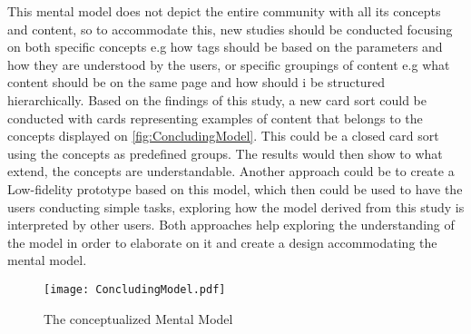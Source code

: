 This mental model does not depict the entire community with all its concepts and content, so to accommodate this, new studies should be conducted focusing on both specific concepts e.g how tags should be based on the parameters and how they are understood by the users, or specific groupings of content e.g what content should be on the same page and how should i be structured hierarchically. Based on the findings of this study, a new card sort could be conducted with cards representing examples of content that belongs to the concepts displayed on \autoref{fig:ConcludingModel}. This could be a closed card sort using the concepts as predefined groups. The results would then show to what extend, the concepts are understandable. Another approach could be to create a Low-fidelity prototype based on this model, which then could be used to have the users conducting simple tasks, exploring how the model derived from this study is interpreted by other users. Both approaches help exploring the understanding of the model in order to elaborate on it and create a design accommodating the mental model. 
%
\begin{figure}[H]
	\centering
	\texttt{[image: ConcludingModel.pdf]}
	\caption{The conceptualized Mental Model}
	\label{fig:ConcludingModel}
\end{figure}
%
